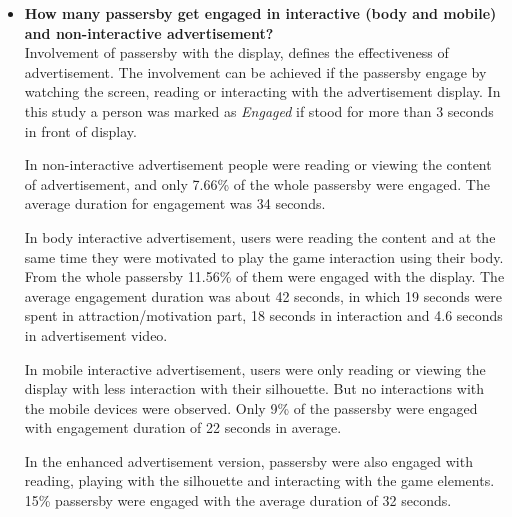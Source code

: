 \begin{itemize}
\iffalse
Honeypot effect, which increases the attention level of passersby toward display, was also statistically increased with the use of body interactive advertisement compared to non-interactive advertisement, and the mobile interactive was insignificant to non-interactive. In enhanced advertisement version the honeypot effects were not increase compared to body interactive maybe because of limited number of days.

Landing effects that drags the passersby suddenly toward display, in non-interactive advertisement this effect were less than interactive advertisement both body and mobile interactive. The landing effect in enhanced version was not significant because of its extended angle of tracking.
\fi



\item \textbf{How many passersby get engaged in interactive (body and mobile) and non-interactive advertisement?} \\
Involvement of passersby with the display, defines the effectiveness of advertisement. The involvement can be achieved if the passersby engage by watching the screen, reading or interacting with the advertisement display. In this study a person was marked as \emph{Engaged} if stood for more than 3 seconds in front of display.

In non-interactive advertisement people were reading or viewing the content of advertisement, and only 7.66\% of the whole passersby were engaged. The average duration for engagement was 34 seconds.

In body interactive advertisement, users were reading the content and at the same time they were motivated to play the game interaction using their body. From the whole passersby 11.56\% of them were engaged with the display. The average engagement duration was about 42 seconds, in which 19 seconds were spent in attraction/motivation part, 18 seconds in interaction and 4.6 seconds in advertisement video.

In mobile interactive advertisement, users were only reading or viewing the display with less interaction with their silhouette. But no interactions with the mobile devices were observed. Only 9\% of the passersby were engaged with engagement duration of 22 seconds in average.

In the enhanced advertisement version, passersby were also engaged with reading, playing with the silhouette and interacting with the game elements. 15\% passersby were engaged with the average duration of 32 seconds. 


\end{itemize}
